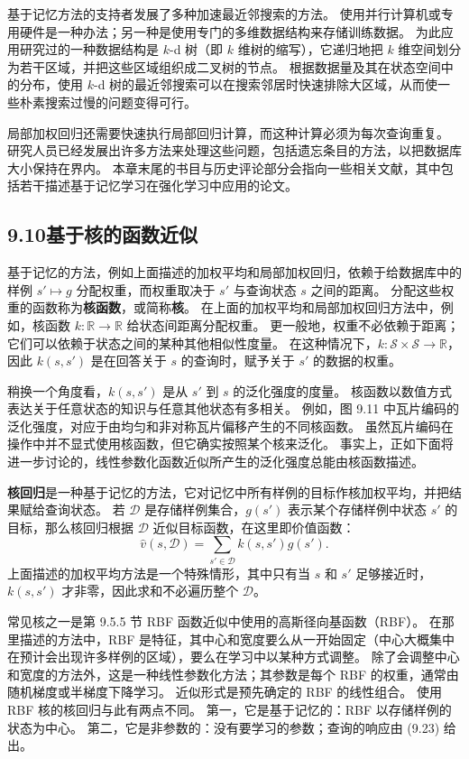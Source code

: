 \documentclass[UTF8,12pt,a4paper,fontset=fandol]{ctexart}
\begin{document}
基于记忆方法的支持者发展了多种加速最近邻搜索的方法。
使用并行计算机或专用硬件是一种办法；另一种是使用专门的多维数据结构来存储训练数据。
为此应用研究过的一种数据结构是 $k$-d 树（即 $k$ 维树的缩写），它递归地把 $k$ 维空间划分为若干区域，并把这些区域组织成二叉树的节点。
根据数据量及其在状态空间中的分布，使用 $k$-d 树的最近邻搜索可以在搜索邻居时快速排除大区域，从而使一些朴素搜索过慢的问题变得可行。

局部加权回归还需要快速执行局部回归计算，而这种计算必须为每次查询重复。
研究人员已经发展出许多方法来处理这些问题，包括遗忘条目的方法，以把数据库大小保持在界内。
本章末尾的书目与历史评论部分会指向一些相关文献，其中包括若干描述基于记忆学习在强化学习中应用的论文。

\subsection*{9.10\quad 基于核的函数近似}

基于记忆的方法，例如上面描述的加权平均和局部加权回归，依赖于给数据库中的样例 $s'\mapsto g$ 分配权重，而权重取决于 $s'$ 与查询状态 $s$ 之间的距离。
分配这些权重的函数称为\textbf{核函数}，或简称\textbf{核}。
在上面的加权平均和局部加权回归方法中，例如，核函数 $k:\mathbb{R}\to\mathbb{R}$ 给状态间距离分配权重。
更一般地，权重不必依赖于距离；它们可以依赖于状态之间的某种其他相似性度量。
在这种情况下，$k:\mathcal{S}\times\mathcal{S}\to\mathbb{R}$，因此 $k(s,s')$ 是在回答关于 $s$ 的查询时，赋予关于 $s'$ 的数据的权重。

稍换一个角度看，$k(s,s')$ 是从 $s'$ 到 $s$ 的泛化强度的度量。
核函数以数值方式表达关于任意状态的知识与任意其他状态有多相关。
例如，图 9.11 中瓦片编码的泛化强度，对应于由均匀和非对称瓦片偏移产生的不同核函数。
虽然瓦片编码在操作中并不显式使用核函数，但它确实按照某个核来泛化。
事实上，正如下面将进一步讨论的，线性参数化函数近似所产生的泛化强度总能由核函数描述。

\textbf{核回归}是一种基于记忆的方法，它对记忆中所有样例的目标作核加权平均，并把结果赋给查询状态。
若 $\mathcal{D}$ 是存储样例集合，$g(s')$ 表示某个存储样例中状态 $s'$ 的目标，那么核回归根据 $\mathcal{D}$ 近似目标函数，在这里即价值函数：
\begin{equation}
\hat{v}(s,\mathcal{D})=\sum_{s'\in\mathcal{D}}k(s,s')g(s').
\tag{9.23}
\end{equation}
上面描述的加权平均方法是一个特殊情形，其中只有当 $s$ 和 $s'$ 足够接近时，$k(s,s')$ 才非零，因此求和不必遍历整个 $\mathcal{D}$。

常见核之一是第 9.5.5 节 RBF 函数近似中使用的高斯径向基函数（RBF）。
在那里描述的方法中，RBF 是特征，其中心和宽度要么从一开始固定（中心大概集中在预计会出现许多样例的区域），要么在学习中以某种方式调整。
除了会调整中心和宽度的方法外，这是一种线性参数化方法；其参数是每个 RBF 的权重，通常由随机梯度或半梯度下降学习。
近似形式是预先确定的 RBF 的线性组合。
使用 RBF 核的核回归与此有两点不同。
第一，它是基于记忆的：RBF 以存储样例的状态为中心。
第二，它是非参数的：没有要学习的参数；查询的响应由 (9.23) 给出。
\end{document}
